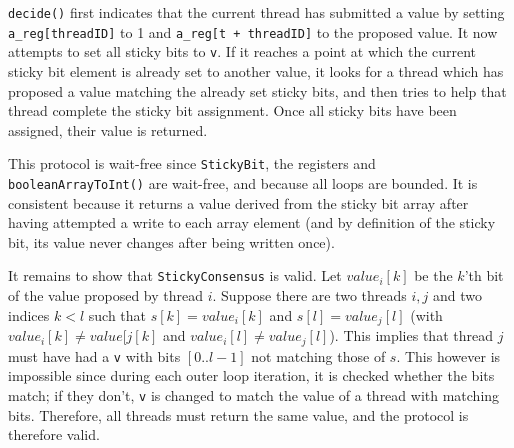 \documentclass[a4paper,10pt]{article}
\begin{document}
\lstinline|decide()| first indicates that the current thread has submitted a value
by setting \lstinline|a_reg[threadID]| to 1 and \lstinline|a_reg[t + threadID]| to the
proposed value. It now attempts to set all sticky bits to \lstinline|v|. If it reaches
a point at which the current sticky bit element is already set to another value,
it looks for a thread which has proposed a value matching the already set sticky bits,
and then tries to help that thread complete the sticky bit assignment. Once all
sticky bits have been assigned, their value is returned.

This protocol is wait-free since \lstinline|StickyBit|, the registers and
\lstinline|booleanArrayToInt()| are wait-free, and because all loops are
bounded. It is consistent because it returns a value derived from the sticky
bit array after having attempted a write to each array element (and by
definition of the sticky bit, its value never changes after being written
once).

It remains to show that \lstinline|StickyConsensus| is valid. Let $value_i[k]$
be the $k$'th bit of the value proposed by thread $i$. Suppose there are two
threads $i, j$ and two indices $k < l$ such that $s[k] = value_i[k]$ and $s[l]
= value_j[l]$ (with $value_i[k] \neq value[j[k]$ and $value_i[l] \neq
value_j[l]$). This implies that thread $j$ must have had a \lstinline|v| with
bits $[0..l -1]$ not matching those of $s$. This however is impossible since
during each outer loop iteration, it is checked whether the bits match; if they
don't, \lstinline|v| is changed to match the value of a thread with matching
bits. Therefore, all threads must return the same value, and the protocol is
therefore valid.


\begin{comment}

Exercise 51: p139

\subsection{Exercise }

\emph{}

\vspace{3mm}

\vspace{3mm}

\begin{align}
S(p) &= \frac{s}{s'} = \frac{2s(p - 1)}{s(p - 1) - 1} \\
     &= \frac{2 \cdot \frac{3}{10} \cdot (p - 1)}{\frac{3}{10} \cdot (p - 1) - 1} 
\end{align}

\begin{figure}
\begin{lstlisting}

\end{lstlisting}
\caption{The Flaky lock used in Exercise 11.}
\label{fig:flaky}
\end{figure}

\end{comment}
\end{document}
